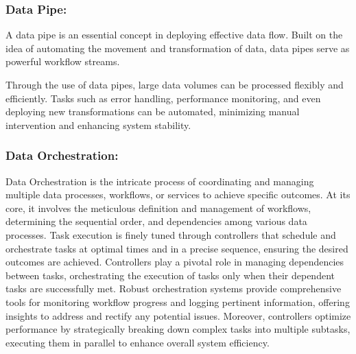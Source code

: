 \subsubsection*{Data Pipe:}

A data pipe is an essential concept in deploying effective data flow. Built on
the idea of automating the movement and transformation of data, data pipes serve
as powerful workflow streams.

Through the use of data pipes, large data volumes can be processed flexibly and
efficiently. Tasks such as error handling, performance monitoring, and even
deploying new transformations can be automated, minimizing manual intervention
and enhancing system stability.


\subsubsection*{Data Orchestration:}

Data Orchestration is the intricate process of coordinating and managing
multiple data processes, workflows, or services to achieve specific outcomes. At
its core, it involves the meticulous definition and management of workflows,
determining the sequential order, and dependencies among various data processes.
Task execution is finely tuned through controllers that schedule and orchestrate
tasks at optimal times and in a precise sequence, ensuring the desired outcomes
are achieved. Controllers play a pivotal role in managing dependencies between
tasks, orchestrating the execution of tasks only when their dependent tasks are
successfully met. Robust orchestration systems provide comprehensive tools for
monitoring workflow progress and logging pertinent information, offering
insights to address and rectify any potential issues. Moreover, controllers
optimize performance by strategically breaking down complex tasks into multiple
subtasks, executing them in parallel to enhance overall system efficiency.